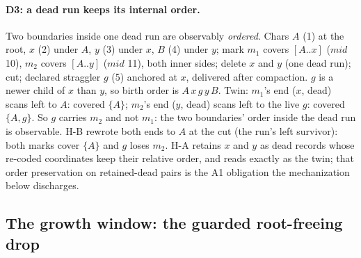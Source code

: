 \documentclass[11pt]{article}
\begin{document}
\paragraph{D3: a dead run keeps its internal order.} Two boundaries
inside one dead run are observably \emph{ordered}. Chars $A$ (1) at
the root, $x$ (2) under $A$, $y$ (3) under $x$, $B$ (4) under $y$;
mark $m_1$ covers $[A..x]$ ($\mathit{mid}$ 10), $m_2$ covers $[A..y]$
($\mathit{mid}$ 11), both inner sides; delete $x$ and $y$ (one dead
run); cut; declared straggler $g$ (5) anchored at $x$, delivered after
compaction. $g$ is a newer child of $x$ than $y$, so birth order is
$A\,x\,g\,y\,B$. Twin: $m_1$'s end ($x$, dead) scans left to $A$:
covered $\{A\}$; $m_2$'s end ($y$, dead) scans left to the live $g$:
covered $\{A, g\}$. So $g$ carries $m_2$ and not $m_1$: the two
boundaries' order inside the dead run is observable. H-B rewrote both
ends to $A$ at the cut (the run's left survivor): both marks cover
$\{A\}$ and $g$ loses $m_2$. H-A retains $x$ and $y$ as dead records
whose re-coded coordinates keep their relative order, and reads
exactly as the twin; that order preservation on retained-dead pairs is
the A1 obligation the mechanization below discharges.

\subsection{The growth window: the guarded root-freeing drop}
\label{sec:markswindow}
\end{document}
